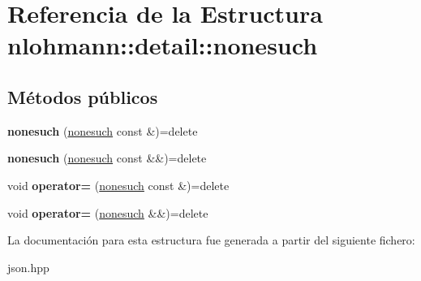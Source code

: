 \hypertarget{structnlohmann_1_1detail_1_1nonesuch}{}\section{Referencia de la Estructura nlohmann\+:\+:detail\+:\+:nonesuch}
\label{structnlohmann_1_1detail_1_1nonesuch}
\subsection*{Métodos públicos}
\begin{DoxyCompactItemize}
\item 
\mbox{\label{structnlohmann_1_1detail_1_1nonesuch_a563462ef2d05fe60cdf1dc7f567dc276}} 
{\bfseries nonesuch} (\mbox{\hyperlink{structnlohmann_1_1detail_1_1nonesuch}{nonesuch}} const \&)=delete
\item 
\mbox{\label{structnlohmann_1_1detail_1_1nonesuch_ad7719f7d2a00263be8b8d123870217d8}} 
{\bfseries nonesuch} (\mbox{\hyperlink{structnlohmann_1_1detail_1_1nonesuch}{nonesuch}} const \&\&)=delete
\item 
\mbox{\label{structnlohmann_1_1detail_1_1nonesuch_add6ef84c52a851e391cef514c85f2ffe}} 
void {\bfseries operator=} (\mbox{\hyperlink{structnlohmann_1_1detail_1_1nonesuch}{nonesuch}} const \&)=delete
\item 
\mbox{\label{structnlohmann_1_1detail_1_1nonesuch_a78ca022a1b4defe4f7ba662843602231}} 
void {\bfseries operator=} (\mbox{\hyperlink{structnlohmann_1_1detail_1_1nonesuch}{nonesuch}} \&\&)=delete
\end{DoxyCompactItemize}


La documentación para esta estructura fue generada a partir del siguiente fichero\+:\begin{DoxyCompactItemize}
\item 
json.\+hpp\end{DoxyCompactItemize}
